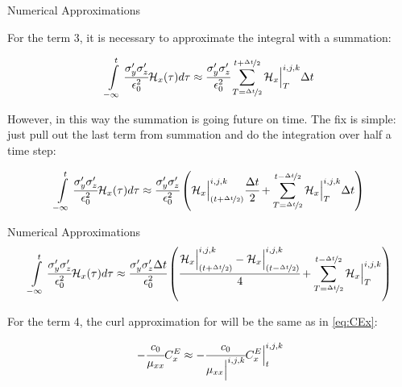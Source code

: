 \documentclass{beamer}
\begin{document}
\begin{frame}{Numerical Approximations}
  
  For the term 3, it is necessary to approximate the integral with a summation:

  \begin{align}
      \int\limits_{-\infty}^t\cfrac{\sigma_y^{\prime}\sigma_z^{\prime}}{\epsilon_0^2}\mathcal{H}_x(\tau)d\tau \approx \cfrac{\sigma_y^{\prime}\sigma_z^{\prime}}{\epsilon_0^2} \sum_{T=\nicefrac{\Delta t}{2}}^{t + \nicefrac{\Delta t}{2}}\mathcal{H}_x\Big|^{i,j,k}_{T}\Delta t
  \end{align}
  
  However, in this way the summation is going future on time. The fix is simple: just pull out the last term from summation and do the integration over half a time step:
  
  \begin{align}
      \int\limits_{-\infty}^t\cfrac{\sigma_y^{\prime}\sigma_z^{\prime}}{\epsilon_0^2}\mathcal{H}_x(\tau)d\tau \nonumber \approx \cfrac{\sigma_y^{\prime}\sigma_z^{\prime}}{\epsilon_0^2} \left( \mathcal{H}_x\Big|_{(t+\nicefrac{\Delta t}{2})}^{i,j,k} \cfrac{\Delta t}{2} + \sum\limits_{T=\nicefrac{\Delta t}{2}}^{t - \nicefrac{\Delta t}{2}}\mathcal{H}_x\Big|^{i,j,k}_{T}\Delta t \right)
  \end{align}
  
\end{frame}

\begin{frame}{Numerical Approximations}
  \begin{align}
    \int\limits_{-\infty}^t\cfrac{\sigma_y^{\prime}\sigma_z^{\prime}}{\epsilon_0^2}\mathcal{H}_x(\tau)d\tau \approx\cfrac{\sigma_y^{\prime}\sigma_z^{\prime}\Delta t}{\epsilon_0^2} \left( \cfrac{\mathcal{H}_x\Big|_{(t+\nicefrac{\Delta t}{2})}^{i,j,k}-\mathcal{H}_x\Big|^{i,j,k}_{(t-\nicefrac{\Delta t}{2})}}{4} + \sum\limits_{T=\nicefrac{\Delta t}{2}}^{t - \nicefrac{\Delta t}{2}}\mathcal{H}_x\Big|^{i,j,k}_{T} \right)
  \end{align}

  For the term 4, the curl approximation for will be the same as in \eqref{eq:CEx}:
  
  \begin{align}
      -\cfrac{c_0}{\mu_{xx}}C_x^E \approx -\cfrac{c_0}{\mu_{xx}\Big|^{i,j,k}}C_x^E\Big|^{i,j,k}_{t}
  \end{align}

\end{frame}
\end{document}
